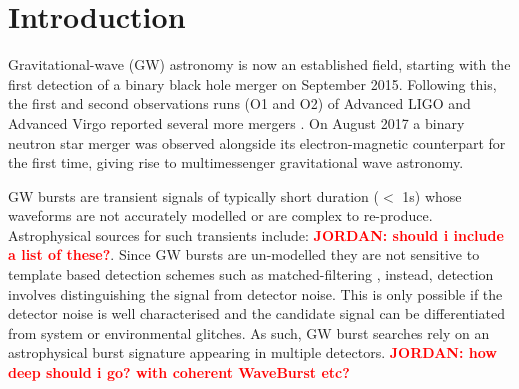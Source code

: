 \documentclass[%
 reprint,
 amsmath,amssymb,
 aps,
]{revtex4-2}
\newcommand{\jordan}[1]{\textbf{\textcolor{red}{JORDAN: #1}}}
\begin{document}

\section{Introduction}

\begin{comment}

\begin{itemize}
\item Need to introduce GWs - the current state of the field e.g. detections
and LVC papers
\item Introduce burst searches - what's the point of burst searches - lots of references
\item Discuss the family of burst waveforms currently used and why - not in detail, just
an introduction
\item Introduce ML techniques in GWs - lots of references
\item What this paper does on GANs in 1 paragraph
\item Describe the structure of the paper 
\end{itemize}
\end{comment}

Gravitational-wave (GW) astronomy is now an established field, starting with the first detection of a binary black hole merger \cite{} on September 2015. Following this, the first and second observations runs (O1 and O2) of Advanced LIGO and Advanced Virgo reported several more mergers \cite{}. On August 2017 a binary neutron star merger was observed alongside its electron-magnetic counterpart for the first time, giving rise to multimessenger gravitational wave astronomy. 

GW bursts are transient signals of typically short duration ($<$ 1s) whose waveforms are not accurately modelled or are complex to re-produce. Astrophysical sources for such transients include: \jordan{should i include a list of these?}. Since GW bursts are un-modelled they are not sensitive to template based detection schemes such as matched-filtering \cite{}, instead, detection involves distinguishing the signal from detector noise. This is only possible if the detector noise is well characterised and the candidate signal can be differentiated from system or environmental glitches. As such, GW burst searches rely on an astrophysical burst signature appearing in multiple detectors. \jordan{how deep should i go? with coherent WaveBurst etc?}
\end{document}
